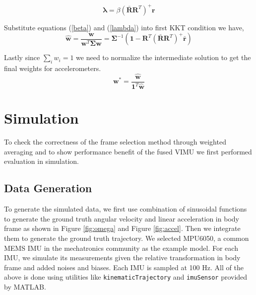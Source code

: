 \documentclass[conference]{IEEEtran}
\begin{document}
\begin{equation}\label{lambda}
    \bm{\lambda} = \beta \left(\bar{\textbf{R}}\textbf{R}^T\right)^{+} \textbf{r}
\end{equation}

Substitute equations (\ref{beta}) and (\ref{lambda}) into first KKT condition we have,
\begin{equation}
    \hat{\textbf{w}} = \frac{\textbf{w}}{\textbf{w}^T\bm{\Sigma}\textbf{w}} = \bm{\Sigma}^{-1} \left( \textbf{1} - \textbf{R}^T \left(\bar{\textbf{R}}\textbf{R}^T\right)^{+} \bar{\textbf{r}} \right)
\end{equation}

Lastly since $\sum_i{w_i} = 1$ we need to normalize the intermediate solution to get the final weights for accelerometers.
\begin{equation}
    \textbf{w}^* = \frac{\hat{\textbf{w}}}{\textbf{1}^T \hat{\textbf{w}}}
\end{equation}

\section{Simulation}

To check the correctness of the frame selection method through weighted averaging and to show performance benefit of the fused VIMU we first performed evaluation in simulation.

\subsection{Data Generation}

To generate the simulated data, we first use combination of sinusoidal functions to generate the ground truth angular velocity and linear acceleration in body frame as shown in Figure \ref{fig:omega} and Figure \ref{fig:accel}. Then we integrate them to generate the ground truth trajectory. We selected MPU6050, a common MEMS IMU in the mechatronics community as the example model. For each IMU, we simulate its measurements given the relative transformation in body frame and added noises and biases. Each IMU is sampled at 100 Hz. All of the above is done using utilities like \texttt{kinematicTrajectory} and \texttt{imuSensor} provided by MATLAB.
\end{document}
